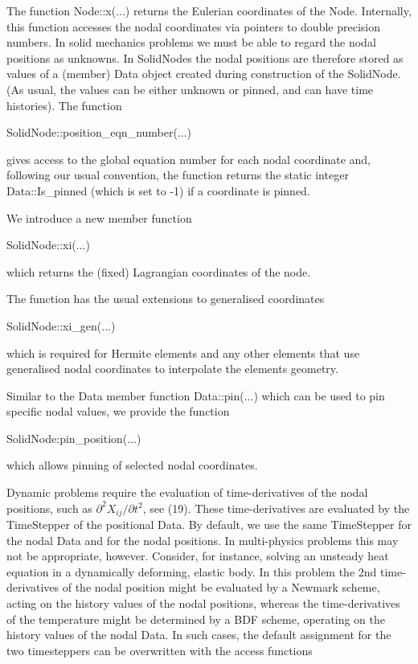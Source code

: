 \begin{DoxyItemize}
\item The function {\ttfamily Node\+::x}(...) returns the Eulerian coordinates of the {\ttfamily Node}. Internally, this function accesses the nodal coordinates via pointers to double precision numbers. In solid mechanics problems we must be able to regard the nodal positions as unknowns. In {\ttfamily Solid\+Nodes} the nodal positions are therefore stored as values of a (member) {\ttfamily Data} object created during construction of the {\ttfamily Solid\+Node}. (As usual, the values can be either unknown or pinned, and can have time histories). The function 
\begin{DoxyCode}
SolidNode::position\_eqn\_number(...)
\end{DoxyCode}
 gives access to the global equation number for each nodal coordinate and, following our usual convention, the function returns the static integer {\ttfamily Data\+::\+Is\+\_\+pinned} (which is set to -\/1) if a coordinate is pinned.
\item We introduce a new member function 
\begin{DoxyCode}
SolidNode::xi(...)
\end{DoxyCode}
 which returns the (fixed) Lagrangian coordinates of the node.
\item The function has the usual extensions to generalised coordinates 
\begin{DoxyCode}
SolidNode::xi\_gen(...)
\end{DoxyCode}
 which is required for Hermite elements and any other elements that use generalised nodal coordinates to interpolate the element\textquotesingle{}s geometry.
\item Similar to the {\ttfamily Data} member function {\ttfamily Data\+::pin}(...) which can be used to pin specific nodal values, we provide the function 
\begin{DoxyCode}
SolidNode:pin\_position(...)
\end{DoxyCode}
 which allows pinning of selected nodal coordinates.
\item Dynamic problems require the evaluation of time-\/derivatives of the nodal positions, such as $ \partial^2 X_{ij}/\partial t^2$, see (19). These time-\/derivatives are evaluated by the {\ttfamily Time\+Stepper} of the positional {\ttfamily Data}. By default, we use the same {\ttfamily Time\+Stepper} for the nodal {\ttfamily Data} and for the nodal positions. In multi-\/physics problems this may not be appropriate, however. Consider, for instance, solving an unsteady heat equation in a dynamically deforming, elastic body. In this problem the 2nd time-\/derivatives of the nodal position might be evaluated by a {\ttfamily Newmark} scheme, acting on the history values of the nodal positions, whereas the time-\/derivatives of the temperature might be determined by a {\ttfamily B\+DF} scheme, operating on the history values of the nodal {\ttfamily Data}. In such cases, the default assignment for the two timesteppers can be overwritten with the access functions 

\end{DoxyItemize}
